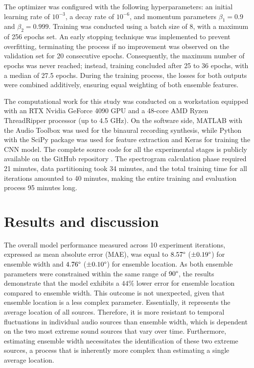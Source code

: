 \documentclass[11pt]{article}
\begin{document}
The optimizer was configured with the following hyperparameters: an initial learning rate of $10^{-3}$, a decay rate of $10^{-6}$, and momentum parameters $\beta_1 = 0.9$ and $\beta_2 = 0.999$. Training was conducted using a batch size of 8, with a maximum of 256 epochs set. An early stopping technique was implemented to prevent overfitting, terminating the process if no improvement was observed on the validation set for 20 consecutive epochs. Consequently, the maximum number of epochs was never reached; instead, training concluded after 25 to 36 epochs, with a median of 27.5 epochs. During the training process, the losses for both outputs were combined additively, ensuring equal weighting of both ensemble features.

The computational work for this study was conducted on a workstation equipped with an RTX Nvidia GeForce 4090 GPU and a 48-core AMD Ryzen ThreadRipper processor (up to 4.5 GHz). On the software side, MATLAB \parencite{MATLAB} with the Audio Toolbox \parencite{MATLAB_Audio_Toolbox} was used for the binaural recording synthesis, while Python \parencite{python} with the SciPy package \parencite{2020SciPy-NMeth} was used for feature extraction and Keras \parencite{chollet_keras_2015} for training the CNN model. The complete source code for all the experimental stages is publicly available on the GitHub repository \parencite{antoniuk_software_2024}. The spectrogram calculation phase required 21 minutes, data partitioning took 34 minutes, and the total training time for all iterations amounted to 40 minutes, making the entire training and evaluation process 95 minutes long.

\section{Results and discussion}
\label{sec:results}

The overall model performance measured across 10 experiment iterations, expressed as mean absolute error (MAE), was equal to $8.57\degree$ ($\pm0.19\degree$) for ensemble width and $4.76\degree$ ($\pm0.10\degree$) for ensemble location. As both ensemble parameters were constrained within the same range of $90\degree$, the results demonstrate that the model exhibits a $44\%$ lower error for ensemble location compared to ensemble width. This outcome is not unexpected, given that ensemble location is a less complex parameter. Essentially, it represents the average location of all sources. Therefore, it is more resistant to temporal fluctuations in individual audio sources than ensemble width, which is dependent on the two most extreme sound sources that vary over time. Furthermore, estimating ensemble width necessitates the identification of these two extreme sources, a process that is inherently more complex than estimating a single average location.
\end{document}
